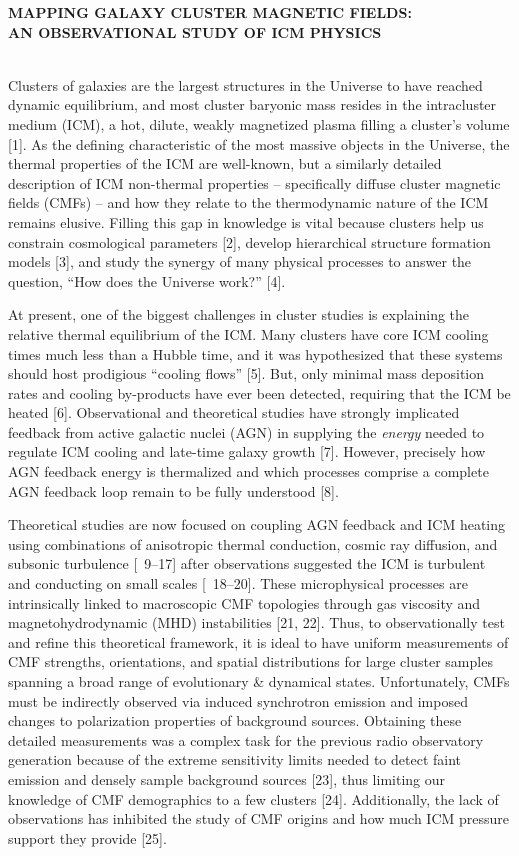\documentclass[letterpaper,12pt]{article}
\begin{document}
\begin{center}
  {\bf\uppercase{mapping galaxy cluster magnetic fields:\\an
      observational study of icm physics}}
\end{center}

\\
\indent Clusters of galaxies are the largest structures in the
Universe to have reached dynamic equilibrium, and most cluster
baryonic mass resides in the intracluster medium (ICM), a hot, dilute,
weakly magnetized plasma filling a cluster's volume [1]. As the
defining characteristic of the most massive objects in the Universe,
the thermal properties of the ICM are well-known, but a similarly
detailed description of ICM non-thermal properties -- specifically
diffuse cluster magnetic fields (CMFs) -- and how they relate to the
thermodynamic nature of the ICM remains elusive. Filling this gap in
knowledge is vital because clusters help us constrain cosmological
parameters [2], develop hierarchical structure formation models [3],
and study the synergy of many physical processes to answer the
question, ``How does the Universe work?'' [4].

At present, one of the biggest challenges in cluster studies is
explaining the relative thermal equilibrium of the ICM. Many clusters
have core ICM cooling times much less than a Hubble time, and it was
hypothesized that these systems should host prodigious ``cooling
flows'' [5]. But, only minimal mass deposition rates and cooling
by-products have ever been detected, requiring that the ICM be heated
[6]. Observational and theoretical studies have strongly implicated
feedback from active galactic nuclei (AGN) in supplying the
{\it{energy}} needed to regulate ICM cooling and late-time galaxy
growth [7]. However, precisely how AGN feedback energy is thermalized
and which processes comprise a complete AGN feedback loop remain to be
fully understood [8].

Theoretical studies are now focused on coupling AGN feedback and ICM
heating using combinations of anisotropic thermal conduction, cosmic
ray diffusion, and subsonic turbulence [\eg\ 9--17] after observations
suggested the ICM is turbulent and conducting on small scales
[\eg\ 18--20]. These microphysical processes are intrinsically linked
to macroscopic CMF topologies through gas viscosity and
magnetohydrodynamic (MHD) instabilities [21, 22]. Thus, to
observationally test and refine this theoretical framework, it is
ideal to have uniform measurements of CMF strengths, orientations, and
spatial distributions for large cluster samples spanning a broad range
of evolutionary \& dynamical states. Unfortunately, CMFs must be
indirectly observed via induced synchrotron emission and imposed
changes to polarization properties of background sources. Obtaining
these detailed measurements was a complex task for the previous radio
observatory generation because of the extreme sensitivity limits
needed to detect faint emission and densely sample background sources
[23], thus limiting our knowledge of CMF demographics to a few
clusters [24]. Additionally, the lack of observations has inhibited
the study of CMF origins and how much ICM pressure support they
provide [25].
\end{document}
